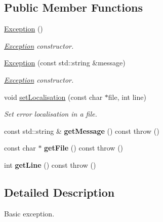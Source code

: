 \subsection*{Public Member Functions}
\begin{DoxyCompactItemize}
\item 
\hypertarget{classFTP_1_1Exception_a2451744502231316fb25c76b9d0e4ad0}{}\hyperlink{classFTP_1_1Exception_a2451744502231316fb25c76b9d0e4ad0}{Exception} ()\label{classFTP_1_1Exception_a2451744502231316fb25c76b9d0e4ad0}

\begin{DoxyCompactList}\small\item\em \hyperlink{classFTP_1_1Exception}{Exception} constructor. \end{DoxyCompactList}\item 
\hyperlink{classFTP_1_1Exception_a2c62e4f58bf71065327a509d87cd1ae0}{Exception} (const std\+::string \&message)
\begin{DoxyCompactList}\small\item\em \hyperlink{classFTP_1_1Exception}{Exception} constructor. \end{DoxyCompactList}\item 
void \hyperlink{classFTP_1_1Exception_a462325fec2828a1cc5d06b9b1994dc49}{set\+Localisation} (const char $\ast$file, int line)
\begin{DoxyCompactList}\small\item\em Set error localisation in a file. \end{DoxyCompactList}\item 
\hypertarget{classFTP_1_1Exception_ab8184759911a05c6ff47b0807237fae9}{}const std\+::string \& {\bfseries get\+Message} () const   throw ()\label{classFTP_1_1Exception_ab8184759911a05c6ff47b0807237fae9}

\item 
\hypertarget{classFTP_1_1Exception_a16f83d3adfebfb58402c761d337e7ff0}{}const char $\ast$ {\bfseries get\+File} () const   throw ()\label{classFTP_1_1Exception_a16f83d3adfebfb58402c761d337e7ff0}

\item 
\hypertarget{classFTP_1_1Exception_a76b9ea580b17dc54d29b1e42525711c2}{}int {\bfseries get\+Line} () const   throw ()\label{classFTP_1_1Exception_a76b9ea580b17dc54d29b1e42525711c2}

\end{DoxyCompactItemize}


\subsection{Detailed Description}
Basic exception. 


